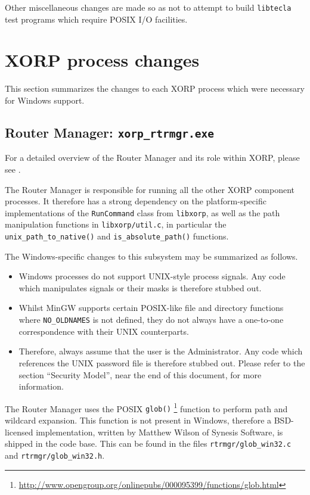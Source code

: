 \documentclass[11pt]{article}
\begin{document}
{Other miscellaneous changes are made so as not to attempt to build
{\tt libtecla} test programs which require POSIX I/O facilities. 


\section{XORP process changes}

This section summarizes the changes to each XORP process which were
necessary for Windows support.

\subsection{Router Manager: {\tt xorp\_rtrmgr.exe}}

For a detailed overview of the Router Manager and its role within XORP,
please see \cite{xorp:rtrmgr}.

The Router Manager is responsible for running all the other XORP component
processes. It therefore has a strong dependency on the platform-specific
implementations of the {\tt RunCommand} class from {\tt libxorp}, as well as
the path manipulation functions in {\tt libxorp/util.c}, in particular the
{\tt unix\_path\_to\_native()} and {\tt is\_absolute\_path()} functions.

The Windows-specific changes to this subsystem may be summarized as follows.
\begin{itemize}
 \item Windows processes do not support UNIX-style process signals.
Any code which manipulates signals or their masks is therefore stubbed out.
 \item Whilst MinGW supports certain POSIX-like file and directory
functions where {\tt NO\_OLDNAMES} is not defined, they do not always
have a one-to-one correspondence with their UNIX counterparts.
 \item Therefore, always assume that the user is the Administrator. Any
code which references the UNIX password file is therefore stubbed out.
Please refer to the section ``Security Model'', near the end of this document,
for more information.
\end{itemize}

The Router Manager uses the POSIX {\tt glob()}
\footnote{\url{http://www.opengroup.org/onlinepubs/000095399/functions/glob.html}}
function to perform path and wildcard expansion.
This function is not present in Windows, therefore
a BSD-licensed implementation, written by Matthew Wilson of Synesis Software,
is shipped in the code base.
This can be found in the files {\tt rtrmgr/glob\_win32.c}
and {\tt rtrmgr/glob\_win32.h}.

}
\end{document}
